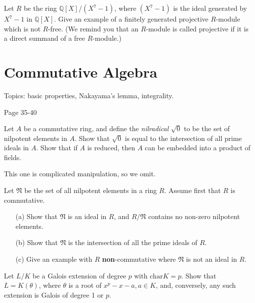 \begin{prob}[F2000-Q6]
    Let \(R\) be the ring \(\mathbb{Q}[X]/(X^7-1)\), where \((X^7-1)\) is the ideal generated by \(X^7-1\) in \(\mathbb{Q}[X]\). Give an example of a finitely generated projective \(R\)-module which is not \(R\)-free. (We remind you that an \(R\)-module is called projective if it is a direct summand of a free \(R\)-module.)
\end{prob}










\chapter{Commutative Algebra}
Topics: basic properties, Nakayama's lemma, integrality.

Page 35-40


\begin{prob}[S2017-Q1]
    Let \(A\) be a commutative ring, and define the \textit{nilradical} \(\sqrt{0}\) to be the set of nilpotent elements in \(A\). Show that \(\sqrt{0}\) is equal to the intersection of all prime ideals in \(A\). Show that if \(A\) is reduced, then \(A\) can be embedded into a product of fields.
\end{prob}
This one is complicated manipulation, so we omit.


\begin{prob}[F2004-Q2]
    Let \(\mathfrak{N}\) be the set of all nilpotent elements in a ring \(R\). Assume first that \(R\) is commutative.
    \begin{itemize}
        \item[(a)] Show that \(\mathfrak{N}\) is an ideal in \(R\), and \(R/\mathfrak{N}\) contains no non-zero nilpotent elements.
        \item[(b)] Show that \(\mathfrak{N}\) is the intersection of all the prime ideals of \(R\).
        \item[(c)] Give an example with \(R\) \textbf{non}-commutative where \(\mathfrak{N}\) is not an ideal in \(R\).
    \end{itemize}
\end{prob}

\begin{prob}[S2014-Q4]
    Let \(L/K\) be a Galois extension of degree \(p\) with \(\text{char}K=p\). Show that \(L=K(\theta)\), where \(\theta\) is a root of \(x^{p}-x-a,a\in K\), and, conversely, any such extension is Galois of degree 1 or \(p\).
\end{prob}





